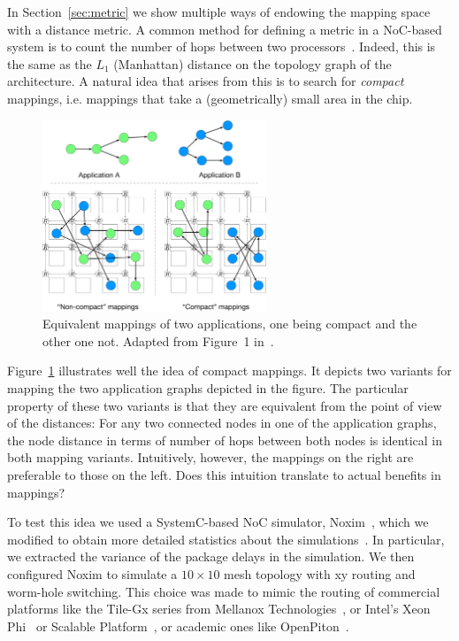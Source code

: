 In Section~\ref{sec:metric} we show multiple ways of endowing the mapping space with a distance metric.
A common method for defining a metric in a \ac{NoC}-based system is to count the number of hops between two processors~\cite{singh2010communication,schwarzer2017symmetry}.
Indeed, this is the same as the $L_1$ (Manhattan) distance on the topology graph of the architecture.
A natural idea that arises from this is to search for \emph{compact} mappings, i.e. mappings that take a (geometrically) small area in the chip.


\begin{figure}[th]
	\centering
	\includegraphics[width=0.6\textwidth]{figures/compact_intro.pdf}
	\caption{Equivalent mappings of two applications, one being compact and the other one not. Adapted from Figure~1 in~\cite{goens_samos19}.}
	\label{fig:compact_intro}
\end{figure}

Figure~\ref{fig:compact_intro} illustrates well the idea of compact mappings.
It depicts two variants for mapping the two application graphs depicted in the figure.
The particular property of these two variants is that they are equivalent from the point of view of the distances:
For any two connected nodes in one of the application graphs, the node distance in terms of number of hops between both nodes is identical in both mapping variants.
Intuitively, however, the mappings on the right are preferable to those on the left. 
Does this intuition translate to actual benefits in mappings?

To test this idea we used a SystemC-based \ac{NoC} simulator, Noxim~\cite{noxim}, which we modified to obtain more detailed statistics about the simulations~\cite{goens_samos19}.
In particular, we extracted the variance of the package delays in the simulation. 
We then configured Noxim to simulate a $10 \times 10$ mesh topology with xy routing and worm-hole switching. 
This choice was made to mimic the routing of commercial platforms like the Tile-Gx series from Mellanox Technologies~\cite{technologies2015-tile-gx36-processor,technologies2015-tile-gx72-processor}, or Intel's Xeon Phi~\cite{tam2018-skylake-sp} or Scalable Platform~\cite{sodani2016-knights-landing}, or academic ones like OpenPiton~\cite{balkind2016-openpiton}.

